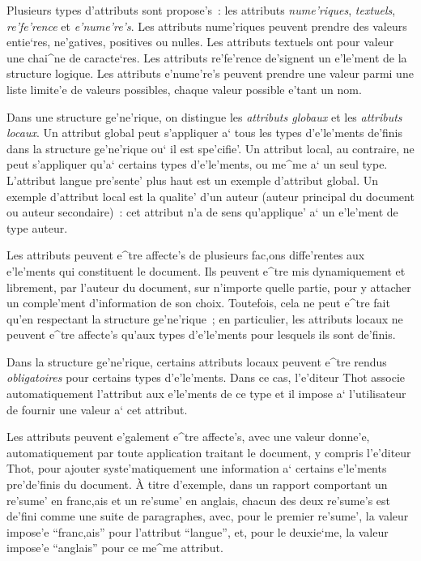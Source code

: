 Plusieurs types d'attributs sont propose's~: les attributs {\em nume'riques},
{\em textuels}, {\em re'fe'rence} et {\em e'nume're's}.
Les attributs nume'riques peuvent prendre des valeurs entie`res, ne'gatives,
positives ou nulles.
Les attributs textuels ont pour valeur une chai^ne de caracte`res.
Les attributs re'fe'rence de'signent un e'le'ment de la structure logique.
Les attributs e'nume're's peuvent prendre une valeur parmi une liste limite'e
de valeurs possibles, chaque valeur possible e'tant un nom.

Dans une structure ge'ne'rique, on distingue les {\em attributs globaux} et
les {\em attributs locaux}. Un attribut global peut s'appliquer a` tous les types
d'e'le'ments de'finis dans la structure ge'ne'rique ou` il est spe'cifie'. Un
attribut local, au contraire, ne peut s'appliquer qu'a` certains types
d'e'le'ments, ou me^me a` un seul type. L'attribut langue pre'sente' plus haut
est un exemple d'attribut global. Un exemple d'attribut local est la
qualite' d'un auteur (auteur principal du document ou auteur secondaire)~:
cet attribut n'a de sens qu'applique' a` un e'le'ment de type auteur.

Les attributs peuvent e^tre affecte's de plusieurs fac,ons diffe'rentes aux
e'le'ments qui constituent le document.
Ils peuvent e^tre mis dynamiquement et librement, par l'auteur du
document, sur n'importe quelle partie, pour y attacher un comple'ment
d'information de son choix. Toutefois, cela ne peut e^tre fait qu'en
respectant la structure ge'ne'rique~; en particulier, les attributs locaux ne
peuvent e^tre affecte's qu'aux types d'e'le'ments pour lesquels ils sont
de'finis. 

Dans la structure ge'ne'rique, certains attributs locaux peuvent e^tre rendus
{\em obligatoires} pour certains types d'e'le'ments. Dans ce cas,
l'e'diteur Thot associe automatiquement l'attribut aux e'le'ments de ce
type et il impose a` l'utilisateur de fournir une valeur a` cet attribut.

Les attributs peuvent e'galement e^tre affecte's, avec une valeur donne'e,
automatiquement par toute application traitant le document, y compris
l'e'diteur Thot, pour ajouter syste'matiquement une information a`
certains e'le'ments pre'de'finis du document. \`{A} titre d'exemple, dans
un rapport comportant un re'sume' en franc,ais et un re'sume' en
anglais, chacun des deux re'sume's est de'fini comme une suite de
paragraphes, avec, pour le premier re'sume', la valeur impose'e ``franc,ais''
pour l'attribut ``langue'', et, pour le deuxie`me, la valeur impose'e
``anglais'' pour ce me^me attribut.

